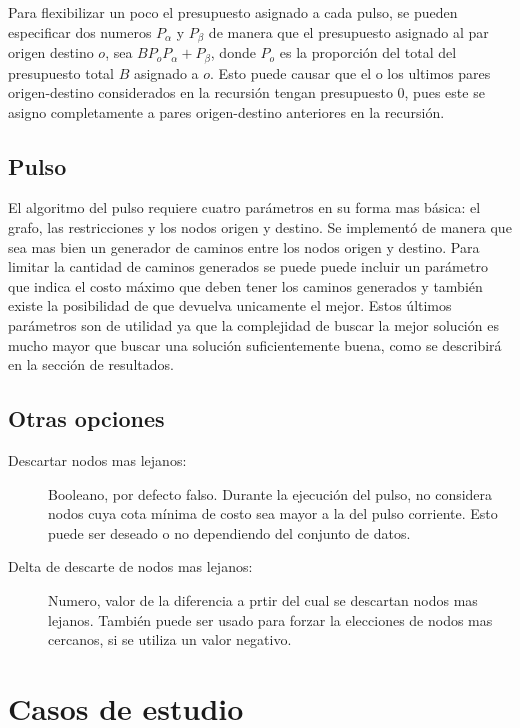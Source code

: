 \documentclass{article}
\begin{document}
  Para flexibilizar un poco el presupuesto asignado a cada pulso, se pueden especificar dos numeros $P_{\alpha}$ y $P_{\beta}$ de manera que el presupuesto asignado al par origen destino $o$, sea $BP_oP_{\alpha} + P_{\beta}$, donde $P_o$ es la proporción del total del presupuesto total $B$ asignado a $o$. Esto puede causar que el o los ultimos pares origen-destino considerados en la recursión tengan presupuesto $0$, pues este se asigno completamente a pares origen-destino anteriores en la recursión.

  \subsection*{Pulso}

  El algoritmo del pulso requiere cuatro parámetros en su forma mas básica: el grafo, las restricciones y los nodos origen y destino. Se implementó de manera que sea mas bien un generador de caminos entre los nodos origen y destino. Para limitar la cantidad de caminos generados se puede puede incluir un parámetro que indica el costo máximo que deben tener los caminos generados y también existe la posibilidad de que devuelva unicamente el mejor. Estos últimos parámetros son de utilidad ya que la complejidad de buscar la mejor solución es mucho mayor que buscar una solución suficientemente buena, como se describirá en la sección de resultados.

  \subsection*{Otras opciones}

  \begin{description}
    \item[Descartar nodos mas lejanos:] Booleano, por defecto falso. Durante la ejecución del pulso, no considera nodos cuya cota mínima de costo sea mayor a la del pulso corriente. Esto puede ser deseado o no dependiendo del conjunto de datos.
    \item[Delta de descarte de nodos mas lejanos:] Numero, valor de la diferencia a prtir del cual se descartan nodos mas lejanos. También puede ser usado para forzar la elecciones de nodos mas cercanos, si se utiliza un valor negativo.
  \end{description}

  \section*{Casos de estudio}
\end{document}
